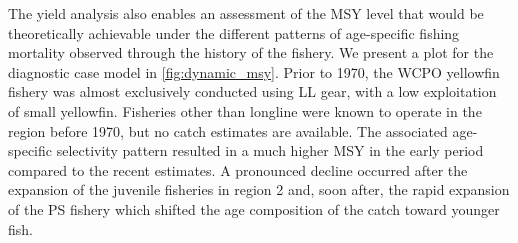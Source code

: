 The yield analysis also enables an assessment of the MSY level that would be theoretically achievable under the different patterns of age-specific fishing mortality observed through the history of the fishery. We present a plot for the diagnostic case model in \autoref{fig:dynamic_msy}. Prior to 1970, the WCPO yellowfin fishery was almost exclusively conducted using LL gear, with a low exploitation of small yellowfin. Fisheries other than longline were known to operate in the region before 1970, but no catch estimates are available. The associated age-specific selectivity pattern resulted in a much higher MSY in the early period compared to the recent estimates. A pronounced decline occurred after the expansion of the juvenile fisheries in region 2 and, soon after, the rapid expansion of the PS fishery which shifted the age composition of the catch toward younger fish.
